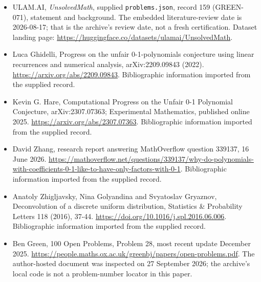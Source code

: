\documentclass[11pt,a4paper]{article}
\begin{document}
{\small

\begin{itemize}

\item[\hypertarget{source:159:1}{S1}] ULAM.AI, \emph{UnsolvedMath}, supplied \texttt{problems.json}, record 159 (GREEN-071), statement and background. The embedded literature-review date is 2026-08-17; that is the archive’s review date, not a fresh certification. Dataset landing page: \url{https://huggingface.co/datasets/ulamai/UnsolvedMath}.

\item[\hypertarget{source:159:2}{S2}] Luca Ghidelli, Progress on the unfair 0-1-polynomials conjecture using linear recurrences and numerical analysis, arXiv:2209.09843 (2022). \url{https://arxiv.org/abs/2209.09843}. Bibliographic information imported from the supplied record.

\item[\hypertarget{source:159:3}{S3}] Kevin G. Hare, Computational Progress on the Unfair 0-1 Polynomial Conjecture, arXiv:2307.07363; Experimental Mathematics, published online 2025. \url{https://arxiv.org/abs/2307.07363}. Bibliographic information imported from the supplied record.

\item[\hypertarget{source:159:4}{S4}] David Zhang, research report answering MathOverflow question 339137, 16 June 2026. \url{https://mathoverflow.net/questions/339137/why-do-polynomials-with-coefficients-0-1-like-to-have-only-factors-with-0-1}. Bibliographic information imported from the supplied record.

\item[\hypertarget{source:159:5}{S5}] Anatoly Zhigljavsky, Nina Golyandina and Svyatoslav Gryaznov, Deconvolution of a discrete uniform distribution, Statistics \& Probability Letters 118 (2016), 37-44. \url{https://doi.org/10.1016/j.spl.2016.06.006}. Bibliographic information imported from the supplied record.

\item[\hypertarget{source:159:6}{S6}] Ben Green, 100 Open Problems, Problem 28, most recent update December 2025. \url{https://people.maths.ox.ac.uk/greenbj/papers/open-problems.pdf}. The author-hosted document was inspected on 27 September 2026; the archive’s local code is not a problem-number locator in this paper.

\end{itemize}

}

\label{end:159}
\end{document}
